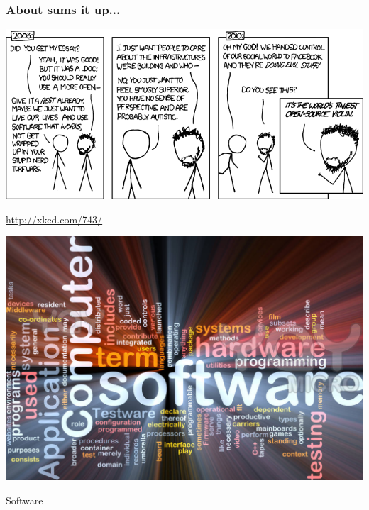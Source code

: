 \documentclass{beamer}
\begin{document}
\begin{frame}
  \frametitle{About sums it up...}
  \begin{center}\includegraphics[width=1\textwidth]{../img/violin}\end{center}
  \begin{footnotesize}
    \textcolor{beamer@myblue}{\href{http://xkcd.com/743/}{http://xkcd.com/743/}}
  \end{footnotesize}
\end{frame}

\begin{frame}
  \begin{center} 
    \includegraphics[width=1\textwidth]{../img/software-words-3}
    \begin{Huge} Software \end{Huge} 
  \end{center}
\end{frame}
\end{document}
